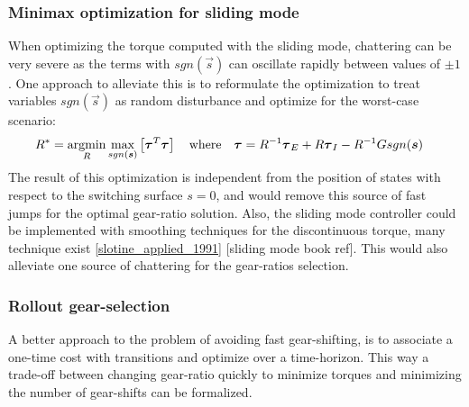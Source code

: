 \subsubsection{Minimax optimization for sliding mode}

When optimizing the torque computed with the sliding mode, chattering can be very severe as the terms with $sgn( \vec{s} )$ can oscillate rapidly between values of $\pm1$. One approach to alleviate this is to reformulate the optimization to treat variables $sgn( \vec{s} )$ as random disturbance and optimize for the worst-case scenario:
%
\begin{align}
R^{*} &= \operatornamewithlimits{argmin}\limits_{R} \operatornamewithlimits{max}\limits_{sgn(\vec{s})} \left[ \vec{\tau}^T\vec{\tau}  \right] \quad\text{where}\quad \vec{\tau} = R^{-1} \vec{\tau}_{E} + R \vec{\tau}_{I} - R^{-1} G sgn( \vec{s} ) 
\end{align} 
%
The result of this optimization is independent from the position of states with respect to the switching surface $s=0$, and would remove this source of fast jumps for the optimal gear-ratio solution. Also, the sliding mode controller could be implemented with smoothing techniques for the discontinuous torque, many technique exist \ref{slotine_applied_1991} [sliding mode book ref]. This would also alleviate one source of chattering for the gear-ratios selection.

\subsubsection{Rollout gear-selection}

A better approach to the problem of avoiding fast gear-shifting, is to associate a one-time cost with transitions and optimize over a time-horizon. This way a trade-off between changing gear-ratio quickly to minimize torques and minimizing the number of gear-shifts can be formalized.

